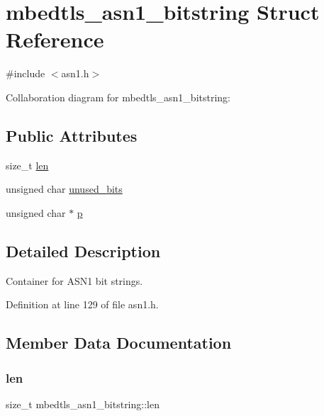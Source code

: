 \hypertarget{structmbedtls__asn1__bitstring}{}\section{mbedtls\+\_\+asn1\+\_\+bitstring Struct Reference}
\label{structmbedtls__asn1__bitstring}


{\ttfamily \#include $<$asn1.\+h$>$}



Collaboration diagram for mbedtls\+\_\+asn1\+\_\+bitstring\+:
\subsection*{Public Attributes}
\begin{DoxyCompactItemize}
\item 
size\+\_\+t \mbox{\hyperlink{structmbedtls__asn1__bitstring_a943b4155650f680f3906ca9be0e66f80}{len}}
\item 
unsigned char \mbox{\hyperlink{structmbedtls__asn1__bitstring_aca26541c9ecb384ef2d5c2ca6a05a25b}{unused\+\_\+bits}}
\item 
unsigned char $\ast$ \mbox{\hyperlink{structmbedtls__asn1__bitstring_af09328f8b1a8cb5bf4afae369ce3629c}{p}}
\end{DoxyCompactItemize}


\subsection{Detailed Description}
Container for A\+S\+N1 bit strings. 

Definition at line 129 of file asn1.\+h.



\subsection{Member Data Documentation}
\mbox{\label{structmbedtls__asn1__bitstring_a943b4155650f680f3906ca9be0e66f80}} 
\subsubsection{\texorpdfstring{len}{len}}
{\footnotesize\ttfamily size\+\_\+t mbedtls\+\_\+asn1\+\_\+bitstring\+::len}

